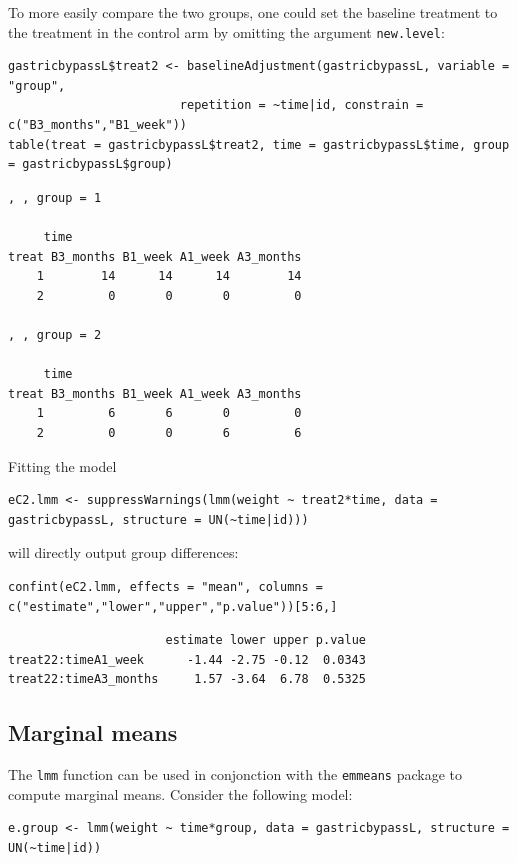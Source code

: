 \documentclass[12pt]{article}
\begin{document}
To more easily compare the two groups, one could set the baseline
treatment to the treatment in the control arm by omitting the argument
\texttt{new.level}:
\lstset{language=r,label= ,caption= ,captionpos=b,numbers=none}
\begin{lstlisting}
gastricbypassL$treat2 <- baselineAdjustment(gastricbypassL, variable = "group",
					    repetition = ~time|id, constrain = c("B3_months","B1_week"))
table(treat = gastricbypassL$treat2, time = gastricbypassL$time, group = gastricbypassL$group)
\end{lstlisting}

\begin{verbatim}
, , group = 1

     time
treat B3_months B1_week A1_week A3_months
    1        14      14      14        14
    2         0       0       0         0

, , group = 2

     time
treat B3_months B1_week A1_week A3_months
    1         6       6       0         0
    2         0       0       6         6
\end{verbatim}

Fitting the model
\lstset{language=r,label= ,caption= ,captionpos=b,numbers=none}
\begin{lstlisting}
eC2.lmm <- suppressWarnings(lmm(weight ~ treat2*time, data = gastricbypassL, structure = UN(~time|id)))
\end{lstlisting}

will directly output group differences:
\lstset{language=r,label= ,caption= ,captionpos=b,numbers=none}
\begin{lstlisting}
confint(eC2.lmm, effects = "mean", columns = c("estimate","lower","upper","p.value"))[5:6,]
\end{lstlisting}
\begin{verbatim}
                      estimate lower upper p.value
treat22:timeA1_week      -1.44 -2.75 -0.12  0.0343
treat22:timeA3_months     1.57 -3.64  6.78  0.5325
\end{verbatim}

\subsection{Marginal means}
\label{sec:org012ea8a}

The \texttt{lmm} function can be used in conjonction with the \texttt{emmeans}
package to compute marginal means. Consider the following model:
\lstset{language=r,label= ,caption= ,captionpos=b,numbers=none}
\begin{lstlisting}
e.group <- lmm(weight ~ time*group, data = gastricbypassL, structure = UN(~time|id))
\end{lstlisting}
\end{document}
